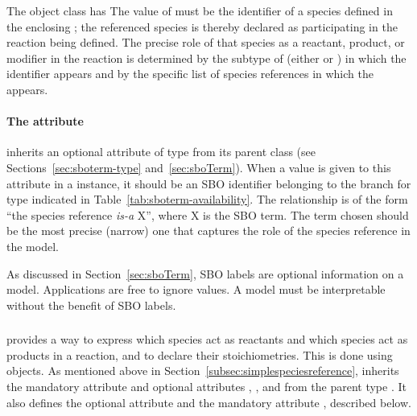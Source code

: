 The \SimpleSpeciesReference object class has   The value of  must be
the identifier of a species defined in the enclosing \Model; the
referenced species is thereby declared as participating in the
reaction being defined.  The precise role of that species as a
reactant, product, or modifier in the reaction is determined by
the subtype of \SimpleSpeciesReference (\ie either
\SpeciesReference or \ModifierSpeciesReference) in which the
identifier appears and by the specific list of species references
in which the \SpeciesReference appears.


\paragraph{The  attribute}
\label{sec:simplespeciesreference-sboterm}

\SimpleSpeciesReference inherits an optional 
attribute of type  from its parent class \SBase
(see Sections~\ref{sec:sboterm-type} and~\ref{sec:sboTerm}).  When
a value is given to this attribute in a \SimpleSpeciesReference
instance, it should be an SBO identifier belonging to the branch
for type \SimpleSpeciesReference indicated in
Table~\ref{tab:sboterm-availability}.  The relationship is of the
form ``the species reference \emph{is-a} X'', where X is the SBO
term.  The term chosen should be the most precise (narrow) one
that captures the role of the species reference in the model.

As discussed in Section~\ref{sec:sboTerm}, SBO labels are optional
information on a model.  Applications are free to ignore
 values.  A model must be interpretable without the
benefit of SBO labels.


\subsubsection{}
\label{subsec:speciesreference}

\Reaction provides a way to express which species act as reactants
and which species act as products in a reaction, and to declare
their stoichiometries.  This is done using \SpeciesReference
objects.  As mentioned above in
Section~\ref{subsec:simplespeciesreference}, \SpeciesReference
inherits the mandatory attribute  and optional
attributes , , and  from the
parent type \SimpleSpeciesReference.  It also defines the optional
attribute  and the mandatory attribute
, described below.


